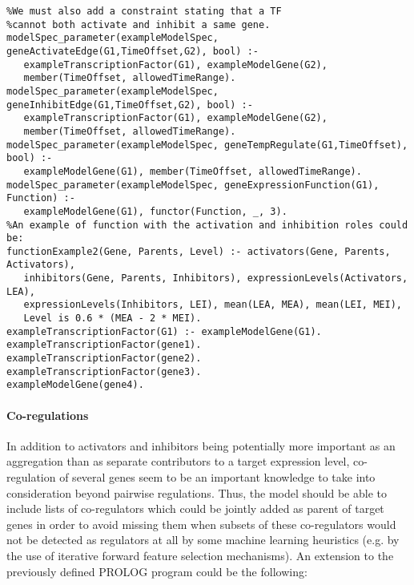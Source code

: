 \documentclass{article}
\begin{document}
\begin{verbatim} 
%We must also add a constraint stating that a TF 
%cannot both activate and inhibit a same gene.
modelSpec_parameter(exampleModelSpec, geneActivateEdge(G1,TimeOffset,G2), bool) :-
   exampleTranscriptionFactor(G1), exampleModelGene(G2),
   member(TimeOffset, allowedTimeRange).
modelSpec_parameter(exampleModelSpec, geneInhibitEdge(G1,TimeOffset,G2), bool) :-
   exampleTranscriptionFactor(G1), exampleModelGene(G2),
   member(TimeOffset, allowedTimeRange).
modelSpec_parameter(exampleModelSpec, geneTempRegulate(G1,TimeOffset), bool) :-
   exampleModelGene(G1), member(TimeOffset, allowedTimeRange).
modelSpec_parameter(exampleModelSpec, geneExpressionFunction(G1), Function) :- 
   exampleModelGene(G1), functor(Function, _, 3).
%An example of function with the activation and inhibition roles could be:
functionExample2(Gene, Parents, Level) :- activators(Gene, Parents, Activators),
   inhibitors(Gene, Parents, Inhibitors), expressionLevels(Activators, LEA), 
   expressionLevels(Inhibitors, LEI), mean(LEA, MEA), mean(LEI, MEI),
   Level is 0.6 * (MEA - 2 * MEI).
exampleTranscriptionFactor(G1) :- exampleModelGene(G1).
exampleTranscriptionFactor(gene1).
exampleTranscriptionFactor(gene2).
exampleTranscriptionFactor(gene3).
exampleModelGene(gene4).
\end{verbatim}

\paragraph{Co-regulations}

In addition to activators and inhibitors being potentially more important as an aggregation than as separate contributors to a target expression level, co-regulation of several genes seem to be an important knowledge to take into consideration beyond pairwise regulations. Thus, the model should be able to include lists of co-regulators which could be jointly added as parent of target genes in order to avoid missing them when subsets of these co-regulators would not be detected as regulators at all by some machine learning heuristics (e.g. by the use of iterative forward feature selection mechanisms). An extension to the previously defined PROLOG program could be the following:
\end{document}
